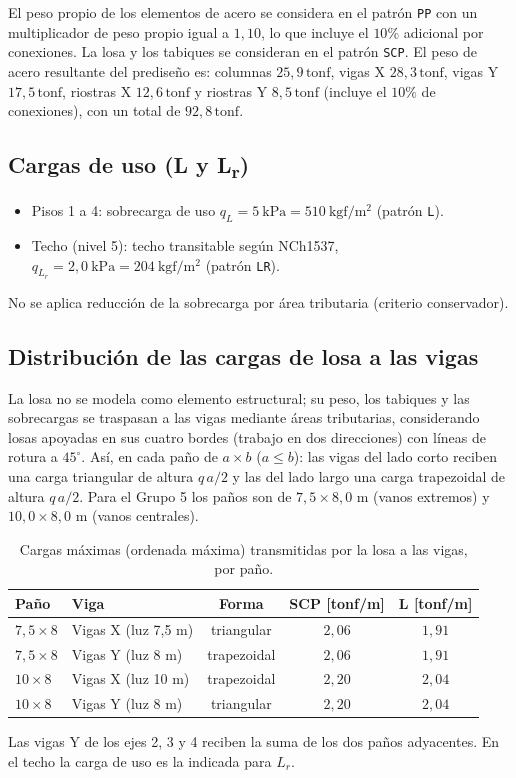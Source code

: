 \documentclass[11pt,letterpaper]{article}
\newcommand{\tonf}{\,\mathrm{tonf}}
\begin{document}
El peso propio de los elementos de acero se considera en el patrón \texttt{PP} con un multiplicador de
peso propio igual a $1{,}10$, lo que incluye el $10\%$ adicional por conexiones. La losa y los tabiques
se consideran en el patrón \texttt{SCP}. El peso de acero resultante del prediseño es:
columnas $25{,}9\tonf$, vigas X $28{,}3\tonf$,
vigas Y $17{,}5\tonf$, riostras X $12{,}6\tonf$ y
riostras Y $8{,}5\tonf$ (incluye el $10\%$ de conexiones), con un total de
$92{,}8\tonf$.

\subsection{\texorpdfstring{Cargas de uso (L y L\textsubscript{r})}{Cargas de uso (L y Lr)}}
\begin{itemize}
  \item Pisos 1 a 4: sobrecarga de uso $q_L = 5\ \mathrm{kPa} = 510\ \mathrm{kgf/m^2}$
        (patrón \texttt{L}).
  \item Techo (nivel 5): techo transitable según NCh1537,
        $q_{L_r} = 2{,}0\ \mathrm{kPa} = 204\ \mathrm{kgf/m^2}$
        (patrón \texttt{LR}). %
\end{itemize}
No se aplica reducción de la sobrecarga por área tributaria (criterio conservador).

\subsection{Distribución de las cargas de losa a las vigas}
La losa no se modela como elemento estructural; su peso, los tabiques y las sobrecargas se traspasan a las
vigas mediante áreas tributarias, considerando losas apoyadas en sus cuatro bordes (trabajo en dos
direcciones) con líneas de rotura a $45^\circ$. Así, en cada paño de $a \times b$ ($a \le b$):
las vigas del lado corto reciben una carga triangular de altura $q\,a/2$ y las del lado largo
una carga trapezoidal de altura $q\,a/2$. Para el Grupo 5 los paños son de
$7{,}5 \times 8{,}0$ m (vanos extremos) y $10{,}0 \times 8{,}0$ m (vanos centrales).

\begin{table}[H]
\centering
\caption{Cargas máximas (ordenada máxima) transmitidas por la losa a las vigas, por paño.}
\begin{tabular}{llccc}
\toprule
Paño & Viga & Forma & SCP [tonf/m] & L [tonf/m] \\
\midrule
$7{,}5 \times 8$ & Vigas X (luz 7,5 m) & triangular & $2{,}06$ & $1{,}91$ \\
$7{,}5 \times 8$ & Vigas Y (luz 8 m) & trapezoidal & $2{,}06$ & $1{,}91$ \\
$10 \times 8$ & Vigas X (luz 10 m) & trapezoidal & $2{,}20$ & $2{,}04$ \\
$10 \times 8$ & Vigas Y (luz 8 m) & triangular & $2{,}20$ & $2{,}04$ \\
\bottomrule
\end{tabular}
\end{table}
Las vigas Y de los ejes 2, 3 y 4 reciben la suma de los dos paños adyacentes. En el techo la carga
de uso es la indicada para $L_r$.
\end{document}

